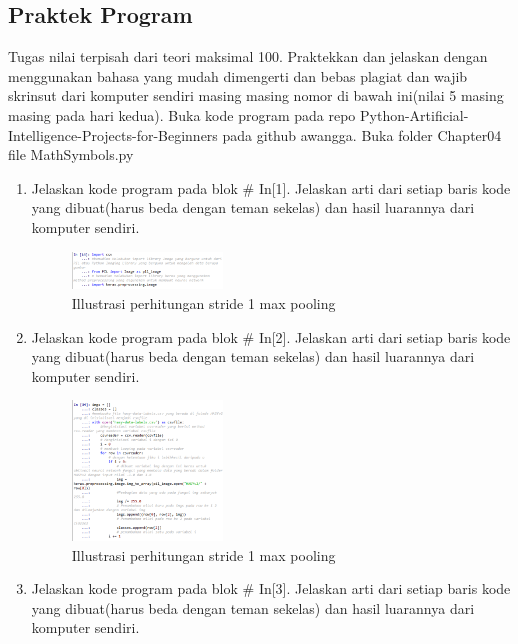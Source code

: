 \subsection{Praktek Program}
Tugas nilai terpisah dari teori maksimal 100. Praktekkan dan jelaskan dengan menggunakan bahasa yang mudah dimengerti dan bebas plagiat dan wajib skrinsut dari komputer sendiri masing masing nomor di bawah ini(nilai 5 masing masing pada hari kedua). Buka kode program pada repo Python-Artificial-Intelligence-Projects-for-Beginners pada github awangga. Buka folder Chapter04 file MathSymbols.py

\begin{enumerate}
\item Jelaskan kode program pada blok \# In[1]. Jelaskan arti dari setiap baris kode yang dibuat(harus beda dengan teman sekelas) dan hasil luarannya dari komputer sendiri.

\begin{figure}[H]
    \includegraphics[width=4cm]{figures/1174035/chapter7/praktek_1.png}
    \centering
    \caption{Illustrasi perhitungan stride 1 max pooling}
\end{figure}
\item Jelaskan kode program pada blok \# In[2]. Jelaskan arti dari setiap baris kode yang dibuat(harus beda dengan teman sekelas) dan hasil luarannya dari komputer sendiri.

\begin{figure}[H]
    \includegraphics[width=4cm]{figures/1174035/chapter7/praktek_2.png}
    \centering
    \caption{Illustrasi perhitungan stride 1 max pooling}
\end{figure}
\item Jelaskan kode program pada blok \# In[3]. Jelaskan arti dari setiap baris kode yang dibuat(harus beda dengan teman sekelas) dan hasil luarannya dari komputer sendiri.


\end{enumerate}
